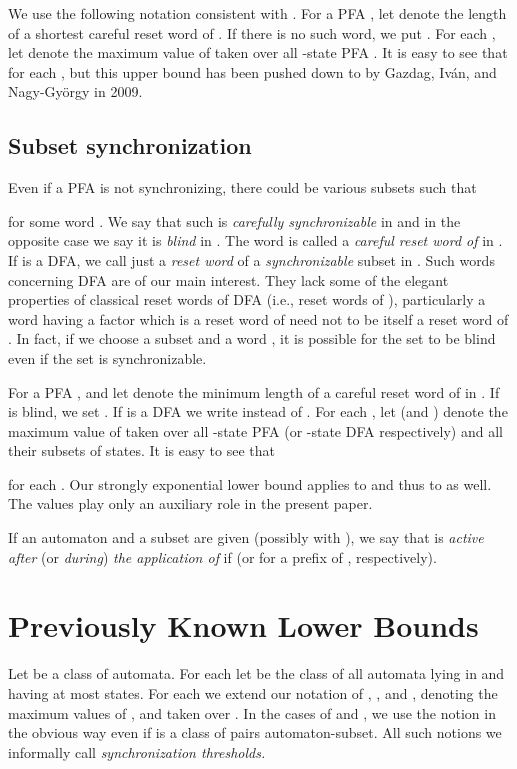 \documentclass{ws-ijmpc}
\begin{document}
We use the following notation consistent with \citep{MAR5}. For a
PFA , let  denote the length of a shortest
careful reset word of . If there is no such word, we put .
For each , let  denote the maximum
value of  taken over all -state PFA .
It is easy to see that  for each
, but this upper bound has been pushed down to 
by Gazdag, Iv\'an, and Nagy-Gy\"{o}rgy \citep{GAZ1} in 2009.


\subsection{Subset synchronization}

Even if a PFA is not synchronizing, there could be various subsets
 such that 

for some word . We say that such  is \emph{carefully
synchronizable} in\emph{ } and in the opposite case we say it
is \emph{blind }in \emph{}. The word  is called a \emph{careful
reset word of  }in \emph{}. If  is a DFA, we call 
just a \emph{reset word} of a \emph{synchronizable} subset  in
. Such words concerning DFA are of our main interest. They lack
some of the elegant properties of classical reset words of DFA (i.e.,
reset words of ), particularly a word  having a factor 
which is a reset word of  need not to be itself a reset word of
. In fact, if we choose a subset  and a word , it is possible
for the set  to be blind even if the set
 is synchronizable.

For a PFA , and  let  denote
the minimum length of a careful reset word of  in . If 
is blind, we set . If  is a DFA we
write  instead of .
For each , let  (and )
denote the maximum value of  taken over all
-state PFA  (or -state DFA  respectively) and all
their subsets of states. It is easy to see that 

for each . Our strongly exponential lower bound applies to 
and thus to  as well. The values 
play only an auxiliary role in the present paper. 

If an automaton  and a subset 
are given (possibly with ), we say that  is \emph{active
after }(or \emph{during}) \emph{the application of 
}if  (or 
for a prefix  of , respectively).


\section{Previously Known Lower Bounds\label{sec:Previously-Known-Lower}}

Let  be a class of automata. For each  let 
be the class of all automata lying in  and having at
most  states. For each  we extend our notation of ,
, and ,
denoting the maximum values of , 
and  taken over .
In the cases of  and ,
we use the notion in the obvious way even if  is a class
of pairs automaton-subset. All such notions we informally call \emph{synchronization
thresholds.} 
\end{document}
